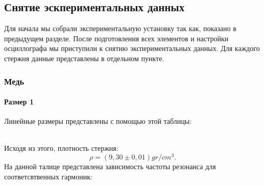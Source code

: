 \documentclass[a4paper, 12pt]{article}%
\begin{document}
\subsection{Снятие эскпериментальных данных}
Для начала мы собрали экспериментальную установку так как, показано в предыдущем разделе. После подготовления всех элементов и настройки осциллографа мы приступили к снятию экспериментальных данных. Для каждого стержня данные представлены в отдельном пункте.
\subsubsection{Медь}
\paragraph*{Размер 1}
Линейные размеры представлены с помощью этой таблицы:
\begin{table}[h]
\end{table}
\\Исходя из этого, плотность стержня:
\begin{equation}
\rho=(9,30\pm0,01)gr/cm^3.
\end{equation}
На данной талице представлена зависимость частоты резонанса для соответсвтвенных гармоник:
\begin{table}[h]
\end{table}
\end{document}
